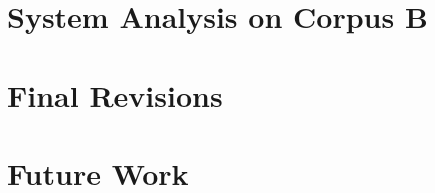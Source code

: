 \documentclass[11pt,letterpaper]{article}
\begin{document}
\section{System Analysis on Corpus B}

\section{Final Revisions}

\section{Future Work}







\label{lastpage}
\end{document}
